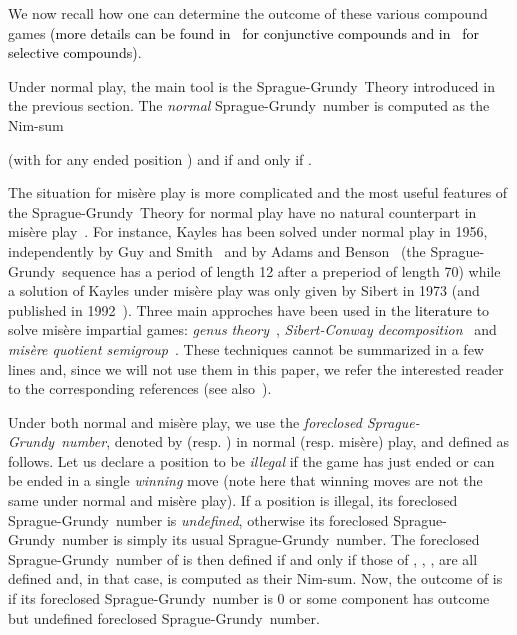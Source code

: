 \documentclass[11pt]{article}
\newcommand{\modif}[1]{\textcolor{black}{#1}}
\newcommand{\SP}{Sprague-Grundy}
\begin{document}
We now recall how one can determine the outcome of these various compound games
\modif{(more details can be found in~\cite[Chapter~9]{WW} for conjunctive compounds and
in~\cite[Chapter~10]{WW} for selective compounds)}.

\vskip 4mm

Under normal play, the main tool is the \SP\ Theory introduced in the previous section.
The {\em normal} \SP\ number  is computed as the Nim-sum

(with  for any ended position )
and  if and only if .

The situation for mis\`ere play is more complicated and the most useful
features of the \SP\ Theory for normal play have no natural
counterpart in mis\`ere play~\cite[Chapter 13]{WW}.
For instance, Kayles has been solved under normal play
in 1956, independently by Guy and Smith~\cite{GUY-SMITH-56}
and by Adams and Benson~\cite{ADAMS-BENSON-56} (the
\SP\ sequence has a period of length 12 after a preperiod
of length 70) while a solution of Kayles under mis\`ere play
was only given by Sibert in 1973 (and published in
1992~\cite{SIBERT-CONWAY-92}).
Three main approches have been used in the \modif{literature} to solve
mis\`ere impartial games:
{\em genus theory}~\cite{ALLEMANG-01,WW},
{\em Sibert-Conway decomposition}~\cite{SIBERT-CONWAY-92}
and {\em mis\`ere quotient semigroup}~\cite{PLAMBECK-05}.
These techniques cannot be summarized in a few lines and,
since we will not use them in this paper, we refer the
interested reader to the corresponding references
(see also~\cite{WEB-PLAMBECK}).

\vskip 4mm

Under both normal and mis\`ere play, we use the {\em foreclosed \SP\ number},
denoted by  (resp. ) in normal (resp. mis\`ere) play, and
defined as follows.
Let us declare a position to be {\em illegal} if the game has just ended
or can be ended in a single {\em winning} move (note here that winning moves are
not the same under normal and mis\`ere play). 
If a position is illegal, its foreclosed \SP\ number
is {\em undefined}, otherwise its foreclosed \SP\ number
is simply its usual \SP\ number.
The foreclosed \SP\ number
of  is then defined if and only if those of 
, , ,  are all defined and, in that case, is computed
as their Nim-sum.
Now, the outcome of  is  if its foreclosed \SP\ number is 0
or some component has outcome  but undefined foreclosed \SP\ number.

\vskip 4mm
\end{document}
